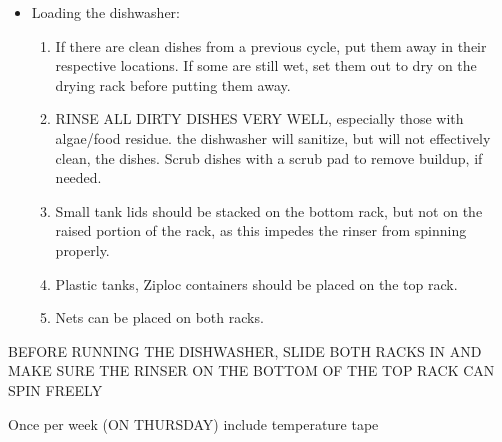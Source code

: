 \documentclass[
  letterpaper,
  DIV=11,
  numbers=noendperiod]{scrreprt}
\providecommand{\tightlist}{%
  \setlength{\itemsep}{0pt}\setlength{\parskip}{0pt}}\usepackage{longtable,booktabs,array}
\begin{document}
\begin{itemize}
\tightlist
\item
  Loading the dishwasher:

  \begin{enumerate}
  \def\labelenumi{\arabic{enumi}.}
  \tightlist
  \item
    If there are clean dishes from a previous cycle, put them away in
    their respective locations. If some are still wet, set them out to
    dry on the drying rack before putting them away.
  \item
    RINSE ALL DIRTY DISHES VERY WELL, especially those with algae/food
    residue. the dishwasher will sanitize, but will not effectively
    clean, the dishes. Scrub dishes with a scrub pad to remove buildup,
    if needed.
  \item
    Small tank lids should be stacked on the bottom rack, but not on the
    raised portion of the rack, as this impedes the rinser from spinning
    properly.
  \item
    Plastic tanks, Ziploc containers should be placed on the top rack.
  \item
    Nets can be placed on both racks.
  \end{enumerate}
\end{itemize}

\begin{tcolorbox}[enhanced jigsaw, toprule=.15mm, breakable, coltitle=black, leftrule=.75mm, title=\textcolor{quarto-callout-note-color}{\faInfo}\hspace{0.5em}{NOTE}, bottomrule=.15mm, toptitle=1mm, bottomtitle=1mm, colframe=quarto-callout-note-color-frame, opacityback=0, colback=white, opacitybacktitle=0.6, colbacktitle=quarto-callout-note-color!10!white, rightrule=.15mm, titlerule=0mm, arc=.35mm, left=2mm]

BEFORE RUNNING THE DISHWASHER, SLIDE BOTH RACKS IN AND MAKE SURE THE
RINSER ON THE BOTTOM OF THE TOP RACK CAN SPIN FREELY

\end{tcolorbox}

\begin{tcolorbox}[enhanced jigsaw, toprule=.15mm, breakable, coltitle=black, leftrule=.75mm, title=\textcolor{quarto-callout-note-color}{\faInfo}\hspace{0.5em}{NOTE}, bottomrule=.15mm, toptitle=1mm, bottomtitle=1mm, colframe=quarto-callout-note-color-frame, opacityback=0, colback=white, opacitybacktitle=0.6, colbacktitle=quarto-callout-note-color!10!white, rightrule=.15mm, titlerule=0mm, arc=.35mm, left=2mm]

Once per week (ON THURSDAY) include temperature tape

\end{tcolorbox}
\end{document}
